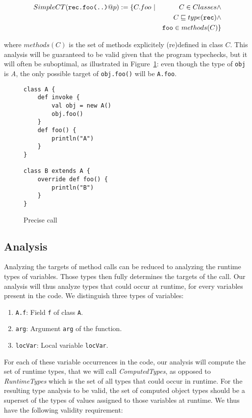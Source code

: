 \begin{eqnarray*}
        SimpleCT(\verb/rec.foo(..)/@p) := \{C.foo ~ &|& C \in Classes \land \\
        && C \subtype type(\verb/rec/) \land \\
        && \verb/foo/ \in methods(C) \}
\end{eqnarray*}

where $methods(C)$ is the set of methods explicitely (re)defined in class $C$.
This analysis will be guaranteed to be valid given that the program typechecks,
but it will often be suboptimal, as illustrated in
Figure~\ref{fig:ta:example2}: even though the type of \verb/obj/ is \emph{A},
the only possible target of \verb/obj.foo()/ will be \verb/A.foo/.

\begin{figure}[h]
    \centering

\begin{lstlisting}
class A {
    def invoke {
        val obj = new A()
        obj.foo()
    }
    def foo() {
        println("A")
    }
}

class B extends A {
    override def foo() {
        println("B")
    }
}
\end{lstlisting}

    \caption{Precise call}
    \label{fig:ta:example2}
\end{figure}

\subsection{Analysis}
Analyzing the targets of method calls can be reduced to analyzing the runtime
types of variables. Those types then fully determines the targets of the call.
Our analysis will thus analyze types that could occur at runtime, for every
variables present in the code. We distinguish three types of variables:
\begin{enumerate}
    \item \verb/A.f/: Field \verb/f/ of class \verb/A/.
    \item \verb/arg/: Argument \verb/arg/ of the function.
    \item \verb/locVar/: Local variable \verb/locVar/.
\end{enumerate}

For each of these variable occurrences in the code, our analysis will compute
the set of runtime types, that we will call \emph{ComputedTypes}, as opposed to
\emph{RuntimeTypes} which is the set of all types that could occur in runtime.
For the resulting type analysis to be valid, the set of computed object types
should be a superset of the types of values assigned to those variables at
runtime.  We thus have the following validity requirement:

